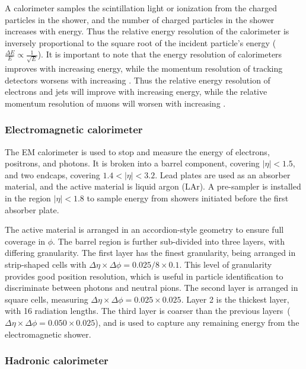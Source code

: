 A calorimeter samples the scintillation light or ionization from the charged
particles in the shower, and the number of charged particles in the shower
increases with energy.
Thus the relative energy resolution of the calorimeter is inversely proportional
to the square root of the incident particle's energy
($\frac{\Delta E}{E} \propto \frac{1}{\sqrt{E}}$).
It is important to note that the energy resolution of calorimeters improves
with increasing energy, while the momentum resolution of tracking detectors
worsens with increasing \pt.
Thus the relative energy resolution of electrons and jets will improve with
increasing energy, while the relative momentum resolution of muons will worsen
with increasing \pt.

\FloatBarrier
\subsubsection{Electromagnetic calorimeter} 
\label{sec:ecal}

The EM calorimeter is used to stop and measure the energy of electrons,
positrons, and photons.
It is broken into a barrel component, covering $|\eta| < 1.5$, and two endcaps,
covering $1.4 < |\eta| < 3.2$.
Lead plates are used as an absorber material, and the active material is
liquid argon (LAr).
A pre-sampler is installed in the region $|\eta| < 1.8$ to sample energy from
showers initiated before the first absorber plate.

The active material is arranged in an accordion-style geometry to ensure full
coverage in $\phi$.
The barrel region is further sub-divided into three layers, with differing
granularity.
The first layer has the finest granularity, being arranged in strip-shaped
cells with $\Delta\eta \times \Delta\phi = 0.025/8 \times 0.1$.
This level of granularity provides good position resolution, which is useful
in particle identification to discriminate between photons and neutral pions.
The second layer is arranged in square cells, measuring
$\Delta\eta \times \Delta\phi = 0.025 \times 0.025$.
Layer 2 is the thickest layer, with 16 radiation lengths.
The third layer is coarser than the previous
layers~($\Delta\eta \times \Delta\phi = 0.050 \times 0.025$), and is used to
capture any remaining energy from the electromagnetic shower.

\FloatBarrier
\subsubsection{Hadronic calorimeter} 
\label{sec:hcal}

